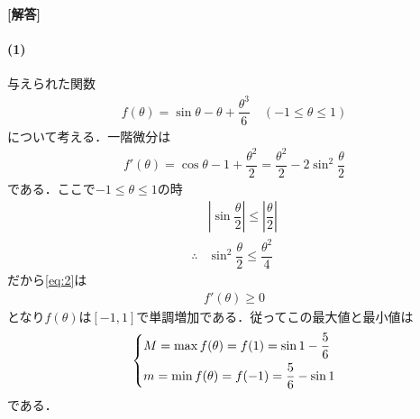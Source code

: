 \documentclass[../../main.tex]{subfiles}
\begin{document}
\begin{oframed}
  
\end{oframed}

{\bf [解答]}

\paragraph{(1)}

与えられた関数
\begin{align}
  f(\theta) = \sin\theta-\theta+\dfrac{\theta^3}{6} \quad (-1 \le \theta \le 1) \label{eq:1}
\end{align}
について考える．一階微分は
\begin{align}
  f'(\theta)=\cos\theta-1+\dfrac{\theta^2}{2}
  =\dfrac{\theta^2}{2}-2\sin^2\dfrac{\theta}{2} \label{eq:2}
\end{align}
である．ここで$-1 \le \theta \le 1$の時
\begin{align}
  & \left|\sin\dfrac{\theta}{2}\right| \le \left|\dfrac{\theta}{2}\right| \\
  \therefore
  & \sin^2\dfrac{\theta}{2} \le \dfrac{\theta^2}{4}
\end{align}
だから\cref{eq:2}は
\begin{align}
  f'(\theta) \ge 0
\end{align}
となり$f(\theta)$は$[-1,1]$で単調増加である．従ってこの最大値と最小値は
\begin{align}
  \begin{dcases}
    M = \max f(\theta) = f(1) = \sin1-\dfrac{5}{6} \\
    m = \min f(\theta) = f(-1)=  \dfrac{5}{6}-\sin1
  \end{dcases} \label{eq:3}
\end{align}
である．
\end{document}
